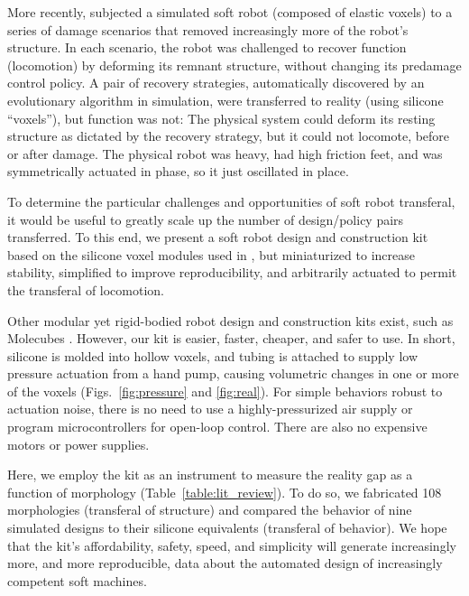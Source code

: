 More recently, \citet{kriegman2019automated} subjected a simulated soft robot (composed of elastic voxels) to a series of damage scenarios that removed increasingly more of the robot's structure.
In each scenario, the robot was challenged to recover function (locomotion) by deforming its remnant structure, without changing its predamage control policy.
A pair of recovery strategies, automatically discovered by an evolutionary algorithm in simulation, were transferred to reality (using silicone ``voxels''), but function was not:
The physical system could deform its resting structure as dictated by the recovery strategy, but it could not locomote, before or after damage.
The physical robot was heavy, 
had high friction feet,
and was symmetrically actuated in phase, so it just oscillated in place.

To determine the particular challenges and opportunities of soft robot transferal, it would be useful to greatly scale up the number of design/policy pairs transferred. 
To this end, we present a soft robot design and construction kit based on the silicone voxel modules used in \cite{kriegman2019automated}, but miniaturized to increase stability, simplified to improve reproducibility, and arbitrarily actuated to permit the transferal of locomotion.


Other modular yet rigid-bodied robot design and construction kits exist, such as Molecubes \cite{zykov2007molecubes}.
However, our kit is easier, faster, cheaper, and safer to use.
In short, silicone is molded into hollow voxels, and tubing is attached to supply low pressure actuation from a hand pump,
causing volumetric changes in one or more of the voxels (Figs.~\ref{fig:pressure} and \ref{fig:real}).
For simple behaviors robust to actuation noise,
there is no need to use a highly-pressurized air supply or program microcontrollers for open-loop control.
There are also no expensive motors or power supplies.

Here, we employ the kit as an instrument to measure the reality gap as a function of morphology (Table~\ref{table:lit_review}).
To do so, we fabricated 108 morphologies (transferal of structure) and compared the behavior of nine simulated designs to their silicone equivalents (transferal of behavior).
We hope that the kit's affordability, safety, speed, and simplicity will generate increasingly more, and more reproducible, data about the automated design of increasingly competent soft machines.

